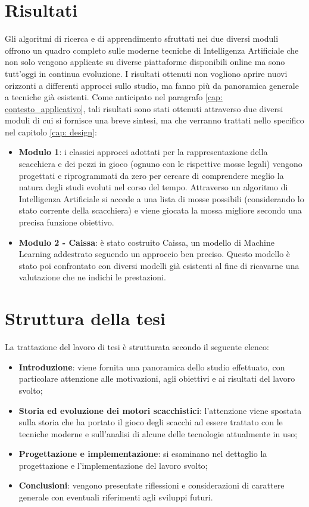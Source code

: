 \section{Risultati}
Gli algoritmi di ricerca e di apprendimento sfruttati nei due diversi moduli offrono un quadro completo sulle moderne tecniche di Intelligenza
Artificiale che non solo vengono applicate su diverse piattaforme disponibili online ma sono tutt'oggi in continua evoluzione. 
I risultati ottenuti non vogliono aprire nuovi orizzonti a differenti approcci sullo studio, 
ma fanno più da panoramica generale a tecniche già esistenti. Come anticipato nel paragrafo \ref{cap: contesto_applicativo}, tali risultati sono stati ottenuti attraverso due diversi moduli di cui si fornisce una breve sintesi, ma che verranno trattati nello specifico nel capitolo \ref{cap: design}:
\begin{itemize}
    \item \textbf{Modulo 1}: i classici approcci adottati per la rappresentazione della scacchiera e dei pezzi in gioco (ognuno con le rispettive mosse legali) vengono progettati e riprogrammati da zero per cercare di comprendere meglio la natura degli studi evoluti nel corso del tempo. Attraverso un algoritmo di Intelligenza Artificiale si accede a una lista di mosse possibili (considerando lo stato corrente della scacchiera) e viene giocata la mossa migliore secondo una precisa funzione obiettivo.
    \item \textbf{Modulo 2 - Caissa}: è stato costruito Caissa, un modello di Machine Learning addestrato seguendo un approccio ben preciso. Questo modello è stato poi confrontato con diversi modelli già esistenti al fine di ricavarne una valutazione che ne indichi le prestazioni. 
\end{itemize}
\newpage
\section{Struttura della tesi}
La trattazione del lavoro di tesi è strutturata secondo il seguente elenco:
\begin{itemize}
    \item \textbf{Introduzione}: viene fornita una panoramica dello studio effettuato, con particolare attenzione alle motivazioni, 
    agli obiettivi e ai risultati del lavoro svolto;
    \item \textbf{Storia ed evoluzione dei motori scacchistici}: l'attenzione viene spostata sulla 
    storia che ha portato il gioco degli scacchi ad essere trattato con le tecniche moderne e sull'analisi di alcune delle tecnologie attualmente in uso;
    \item \textbf{Progettazione e implementazione}: si esaminano nel dettaglio la progettazione e l'implementazione del lavoro svolto;
    \item \textbf{Conclusioni}: vengono presentate riflessioni e considerazioni di carattere generale con eventuali riferimenti agli sviluppi futuri.
\end{itemize}

